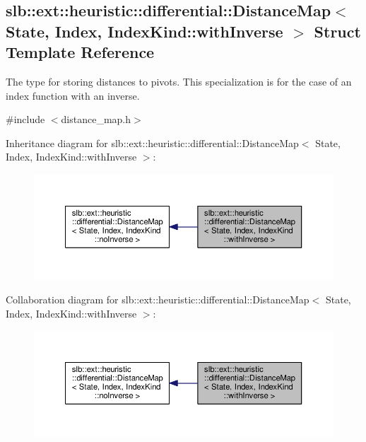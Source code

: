 \hypertarget{structslb_1_1ext_1_1heuristic_1_1differential_1_1DistanceMap_3_01State_00_01Index_00_01IndexKind_1_1withInverse_01_4}{}\subsection{slb\+:\+:ext\+:\+:heuristic\+:\+:differential\+:\+:Distance\+Map$<$ State, Index, Index\+Kind\+:\+:with\+Inverse $>$ Struct Template Reference}
\label{structslb_1_1ext_1_1heuristic_1_1differential_1_1DistanceMap_3_01State_00_01Index_00_01IndexKind_1_1withInverse_01_4}


The type for storing distances to pivots. This specialization is for the case of an index function with an inverse.  




{\ttfamily \#include $<$distance\+\_\+map.\+h$>$}



Inheritance diagram for slb\+:\+:ext\+:\+:heuristic\+:\+:differential\+:\+:Distance\+Map$<$ State, Index, Index\+Kind\+:\+:with\+Inverse $>$\+:\nopagebreak
\begin{figure}[H]
\begin{center}
\leavevmode
\includegraphics[width=350pt]{structslb_1_1ext_1_1heuristic_1_1differential_1_1DistanceMap_3_01State_00_01Index_00_01IndexKinda4e094b5d26922a6f2ab4a0ee02fc340}
\end{center}
\end{figure}


Collaboration diagram for slb\+:\+:ext\+:\+:heuristic\+:\+:differential\+:\+:Distance\+Map$<$ State, Index, Index\+Kind\+:\+:with\+Inverse $>$\+:\nopagebreak
\begin{figure}[H]
\begin{center}
\leavevmode
\includegraphics[width=350pt]{structslb_1_1ext_1_1heuristic_1_1differential_1_1DistanceMap_3_01State_00_01Index_00_01IndexKind5190206f8b9116d6815acfc32d1d666f}
\end{center}
\end{figure}

